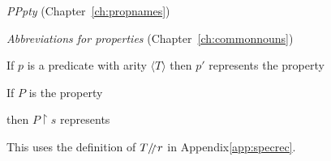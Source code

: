 
\textit{PPpty} (Chapter~\ref{ch:propnames})


\textit{Abbreviations for properties} (Chapter~\ref{ch:commonnouns}) 

If $p$ is a predicate with arity $\langle T\rangle$ then $p'$
represents the property

\begin{quote}
\end{quote}

\bigskip

If $P$ is the property

\begin{quote}
\end{quote}

then $P\!\restriction\!s$ represents

\begin{quote}
\end{quote}






This uses the definition of $T\drestr r$ in
Appendix\ref{app:specrec}. %

